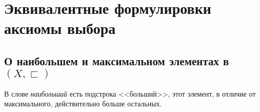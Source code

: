 \documentclass[a4paper]{report}
\begin{document}
    \section{Эквивалентные формулировки аксиомы выбора}

    \subsection{О наибольшем и максимальном элементах в $(X, \sqsubset)$}

     В слове \textit{наибольший} есть подстрока <<больший>>, этот элемент, в отличие от максимального, действительно больше остальных.
\end{document}
